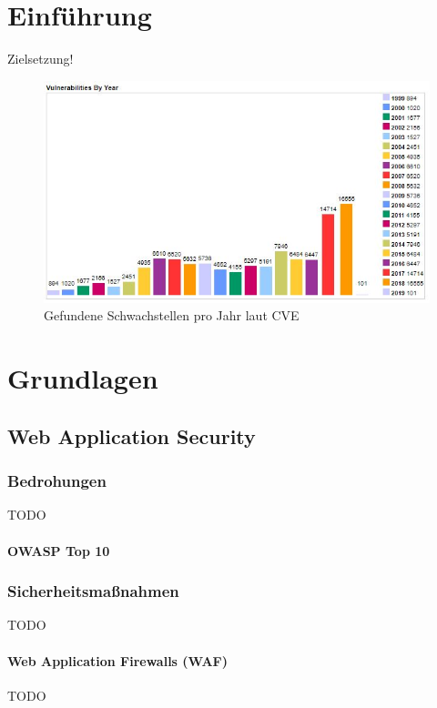 \documentclass[12pt,oneside,a4paper,parskip]{scrbook}
\begin{document}
\mainmatter

\chapter{Einführung}\label{ch:intro}
 Zielsetzung!
  \begin{figure}[!htb]
    \includegraphics[width=1\textwidth]{Images/VulnByYear}
    \caption[Gefundene Schwachstellen pro Jahr laut CVE]{Gefundene Schwachstellen pro Jahr laut CVE \cite{cve}}
  \end{figure}

\chapter{Grundlagen}
  \section{Web Application Security}
    \subsection{Bedrohungen}
    TODO
      \subsubsection{OWASP Top 10}

    \subsection{Sicherheitsmaßnahmen}
    TODO

    \subsubsection{Web Application Firewalls (WAF)}
    TODO
\end{document}

